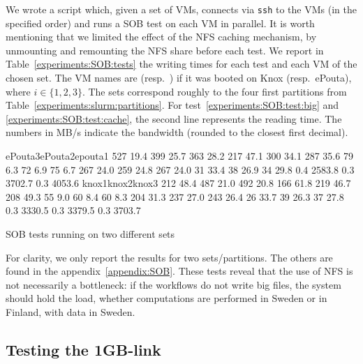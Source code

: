 We wrote a script which, given a set of VMs, connects via \texttt{ssh}
to the VMs (in the specified order) and runs a SOB test on each VM in
parallel.
%
It is worth mentioning that we limited the effect of the NFS caching
mechanism, by unmounting and remounting the NFS share before each
test.
%
We report in Table~\ref{experiments:SOB:tests} the writing times for
each test and each VM of the chosen set.
%
The VM names are  (resp.\ ) if
it was booted on Knox (resp.\ ePouta), where $i\in\{1,2,3\}$.
%
The sets correspond roughly to the four first partitions from
Table~\ref{experiments:slurm:partitions}.
%
For test~\ref{experiments:SOB:test:big} and
\ref{experiments:SOB:test:cache}, the second line represents the
reading time.
%
The numbers in MB/s indicate the bandwidth (rounded to the closest
first decimal).

\begin{table}[!ht]%
\resultpartition%
{{ePouta3}{ePouta2}{epouta1}}%
{{ 527 }{ 19.4   }{ 399 }{ 25.7   }{ 363 }{ 28.2   }}%
{{ 217 }{ 47.1   }{ 300 }{ 34.1   }{ 287 }{ 35.6   }}%
{{  79 }{ 6.3    }{  72 }{ 6.9    }{  75 }{ 6.7    }}%
{{ 267 }{ 24.0   }{ 259 }{ 24.8   }{ 267 }{ 24.0   }}%
{{  31 }{ 33.4   }{  38 }{ 26.9   }{  34 }{ 29.8   }}%
{{ 0.4 }{ 2583.8 }{ 0.3 }{ 3702.7 }{ 0.3 }{ 4053.6 }}
%
\resultpartition%
{{knox1}{knox2}{knox3}}%
{{ 212 }{ 48.4   }{ 487 }{ 21.0   }{ 492 }{ 20.8   }}%
{{ 166 }{ 61.8   }{ 219 }{ 46.7   }{ 208 }{ 49.3   }}%
{{  55 }{ 9.0    }{  60 }{ 8.4    }{  60 }{ 8.3    }}%
{{ 204 }{ 31.3   }{ 237 }{ 27.0   }{ 243 }{ 26.4   }}%
{{  26 }{ 33.7   }{  39 }{ 26.3   }{  37 }{ 27.8   }}%
{{ 0.3 }{ 3330.5 }{ 0.3 }{ 3379.5 }{ 0.3 }{ 3703.7 }}
%
\caption{SOB tests running on two different sets}
\label{experiments:SOB:tests}
\end{table}

For clarity, we only report the results for two sets/partitions. The
others are found in the appendix~\ref{appendix:SOB}. These tests
reveal that the use of NFS is not necessarily a bottleneck: if the
workflows do not write big files, the system should hold the load,
whether computations are performed in Sweden or in Finland, with data
in Sweden.

\subsection{Testing the 1GB-link}
\label{section:experiments:link}

